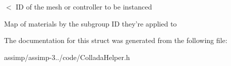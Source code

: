 $<$ I\+D of the mesh or controller to be instanced 

Map of materials by the subgroup I\+D they're applied to 

The documentation for this struct was generated from the following file\+:\begin{DoxyCompactItemize}
\item 
assimp/assimp-\/3../code/Collada\+Helper.\+h\end{DoxyCompactItemize}
